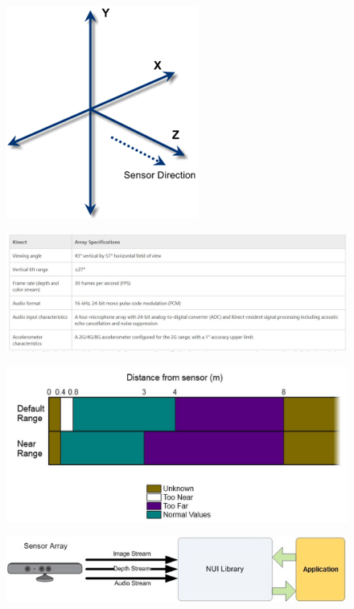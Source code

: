 \begin{figure}[h]
    \centering
    \includegraphics[height=0.25\textheight]{fig02/xyz}
    \label{fig:kinect}
\end{figure}
\begin{figure}[h]
    \centering
    \includegraphics[height=0.25\textheight]{fig02/kinspecs.jpg}
    \label{fig:kinect}
\end{figure}
\begin{figure}[h]
    \centering
    \includegraphics[height=0.25\textheight]{fig02/depthspecs.jpg}
    \label{fig:kinect}
\end{figure}
\begin{figure}[h]
    \centering
    \includegraphics[height=0.25\textheight]{fig02/pipeline}
    \label{fig:kinect}
\end{figure}

